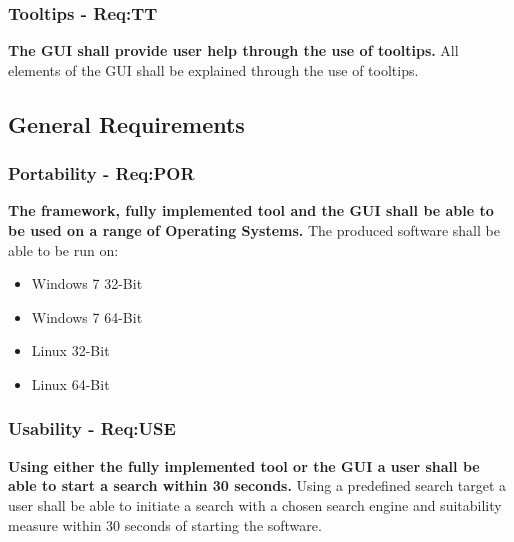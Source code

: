 \subsubsection{Tooltips - Req:TT}
\label{sec:reqtt}
\textbf{The GUI shall provide user help through the use of tooltips.}
All elements of the GUI shall be explained through the use of tooltips.

\subsection{General Requirements}
\subsubsection{Portability - Req:POR}
\label{sec:reqpor}
\textbf{The framework, fully implemented tool and the GUI shall be able to be used on a range of Operating Systems.}
The produced software shall be able to be run on:
\begin{itemize}
 \item Windows 7 32-Bit
 \item Windows 7 64-Bit
 \item Linux 32-Bit
 \item Linux 64-Bit
\end{itemize}

\subsubsection{Usability - Req:USE}
\label{sec:requse}
\textbf{Using either the fully implemented tool or the GUI a user shall be able to start a search within 30 seconds.}
Using a predefined search target a user shall be able to initiate a search with a chosen search engine and suitability measure within 30 seconds of starting the software.